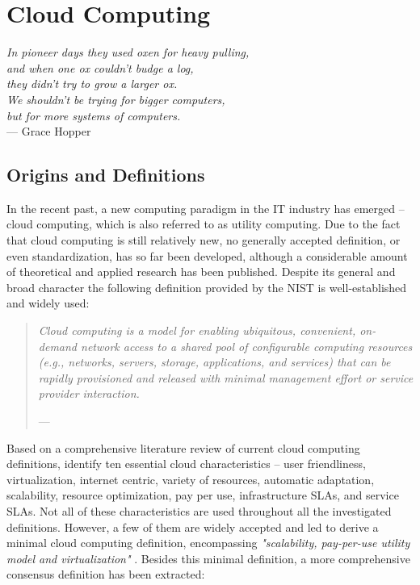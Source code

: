 \section{Cloud Computing}\label{ch:tf:paas}
\begin{flushright}{\slshape 
	In pioneer days they used oxen for heavy pulling,\\
	and when one ox couldn't budge a log,\\
	they didn't try to grow a larger ox.\\
	We shouldn't be trying for bigger computers,\\
	but for more systems of computers.} \\ \medskip
	--- Grace Hopper
\end{flushright}

\vspace*{-18pt}

\subsection{Origins and Definitions}

In the recent past, a new computing paradigm in the \ac{IT} industry has emerged -- cloud computing, which is also referred to as utility computing. Due to the fact that cloud computing is still relatively new, no generally accepted definition, or even standardization, has so far been developed, although a considerable amount of theoretical and applied research has been published. Despite its general and broad character the following definition provided by the \ac{NIST} is well-established and widely used:

\begin{quotation}{\slshape 
Cloud computing is a model for enabling ubiquitous, convenient, on-demand network access to a shared pool of configurable computing resources (e.g., networks, servers, storage, applications, and services) that can be rapidly provisioned and released with minimal management effort or service provider interaction.}
\vspace*{-7pt}
\begin{flushright}
	--- \citealp[p. 2]{Mell2011}
\end{flushright}
\end{quotation}

Based on a comprehensive literature review of current cloud computing definitions, \citet{Vaquero2009} identify ten essential cloud characteristics -- user friendliness, virtualization, internet centric, variety of resources, automatic adaptation, scalability, resource optimization, pay per use, infrastructure \acp{SLA}, and service \acp{SLA}. Not all of these characteristics are used throughout all the investigated definitions. However, a few of them are widely accepted and led \citet{Vaquero2009} to derive a minimal cloud computing definition, encompassing \textit{"scalability, pay-per-use utility model and virtualization"} \citep[p. 51]{Vaquero2009}. Besides this minimal definition, a more comprehensive consensus definition has been extracted:

